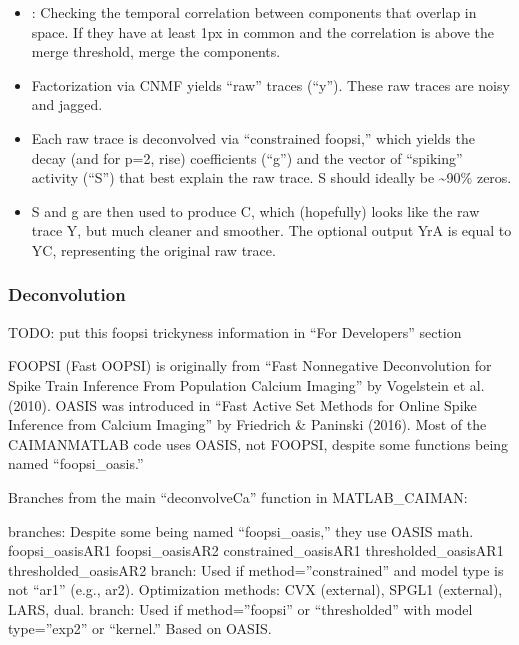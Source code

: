 \documentclass[letterpaper,10pt,english]{sphinxmanual}
\begin{document}
\begin{itemize}
\item {} 
\sphinxAtStartPar
{}: Checking the temporal correlation between components that overlap in space. If they have at least 1px in common and the correlation is above the merge threshold, merge the components.

\item {} 
\sphinxAtStartPar
Factorization via CNMF yields “raw” traces (“y”). These raw traces are noisy and jagged.

\item {} 
\sphinxAtStartPar
Each raw trace is deconvolved via “constrained foopsi,” which yields the decay (and for p=2, rise) coefficients (“g”) and the vector of “spiking” activity (“S”) that best explain the raw trace. S should ideally be \textasciitilde{}90\% zeros.

\item {} 
\sphinxAtStartPar
S and g are then used to produce C, which (hopefully) looks like the raw trace Y, but much cleaner and smoother. The optional output YrA is equal to Y\sphinxhyphen{}C, representing the original raw trace.

\end{itemize}


\subsubsection{Deconvolution}
\label{\detokenize{user_guide/segmentation:deconvolution}}
\sphinxAtStartPar
TODO: put this foopsi trickyness information in “For Developers” section

\sphinxAtStartPar
FOOPSI (Fast OOPSI) is originally from “Fast Nonnegative Deconvolution for Spike Train Inference From Population Calcium Imaging” by Vogelstein et al. (2010).
\sphinxhyphen{} OASIS was introduced in “Fast Active Set Methods for Online Spike Inference from Calcium Imaging” by Friedrich \& Paninski (2016).
\sphinxhyphen{} Most of the CAIMAN\sphinxhyphen{}MATLAB code uses OASIS, not FOOPSI, despite some functions being named “foopsi\_oasis.”

\sphinxAtStartPar
Branches from the main “deconvolveCa” function in MATLAB\_CAIMAN:

\sphinxAtStartPar
{} branches: Despite some being named “foopsi\_oasis,” they use OASIS math.
\sphinxhyphen{} foopsi\_oasisAR1
\sphinxhyphen{} foopsi\_oasisAR2
\sphinxhyphen{} constrained\_oasisAR1
\sphinxhyphen{} thresholded\_oasisAR1
\sphinxhyphen{} thresholded\_oasisAR2
 branch: Used if method=”constrained” and model type is not “ar1” (e.g., ar2).
\sphinxhyphen{} Optimization methods: CVX (external), SPGL1 (external), LARS, dual.
 branch: Used if method=”foopsi” or “thresholded” with model type=”exp2” or “kernel.” Based on OASIS.
\end{document}
